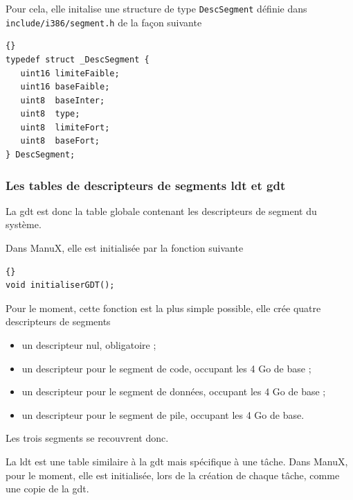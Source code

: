    Pour cela, elle initalise une structure de type
\lstinline!DescSegment! définie dans
\lstinline!include/i386/segment.h! de la façon suivante

\begin{lstlisting}{}
typedef struct _DescSegment {
   uint16 limiteFaible;
   uint16 baseFaible;
   uint8  baseInter;
   uint8  type;
   uint8  limiteFort;
   uint8  baseFort;
} DescSegment;
\end{lstlisting}  

\subsubsection{Les tables de descripteurs de segments {\sc ldt} et {\sc gdt}}

   La {\sc gdt} est donc la table globale contenant les descripteurs
de segment du système.

   Dans ManuX, elle est initialisée par la fonction suivante

\begin{lstlisting}{}
void initialiserGDT();     
\end{lstlisting}

   Pour le moment, cette fonction est la plus simple possible, elle
crée quatre descripteurs de segments

\begin{itemize}
   \item un descripteur nul, obligatoire ;
   \item un descripteur pour le segment de code, occupant les 4 Go de base ;
   \item un descripteur pour le segment de données, occupant les 4 Go de base ;
   \item un descripteur pour le segment de pile, occupant les 4 Go de base.
\end{itemize}

   Les trois segments se recouvrent donc.

   La {\sc ldt} est une table similaire à la {\sc gdt} mais spécifique
à une tâche. Dans ManuX, pour le moment, elle est initialisée, lors de
la création de chaque tâche, comme une copie de la {\sc gdt}.

